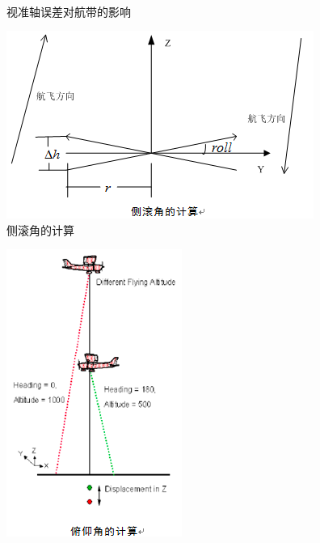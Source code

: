 \begin{enumerate}
\begin{itemize}
\begin{equation}
				\end{equation}
		\end{itemize}
		\begin{figure}[htbp]
			\centering
			\\
			 \hfill
			\caption{视准轴误差对航带的影响}
			\label{fig:视准轴误差对航带的影响}
		\end{figure}
		\begin{figure}[htbp]
			\centering
			\includegraphics[width=0.4\linewidth]{figure/Chapter8/侧滚角的计算}
			\caption{侧滚角的计算}
			\label{fig:侧滚角的计算}
		\end{figure}
		\begin{figure}[htbp]
			\centering
			\includegraphics[width=0.3\linewidth]{figure/Chapter8/俯仰角的计算}

\end{figure}
\end{enumerate}
